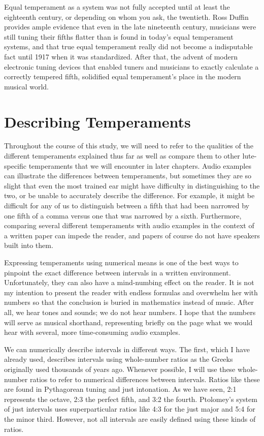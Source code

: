 Equal temperament as a system was not fully accepted until at
least the eighteenth century, or depending on whom you
ask, the twentieth.  Ross Duffin provides ample
evidence that even in the late nineteenth century,
musicians were still tuning their fifths flatter than is found
in today's equal temperament systems, and that true equal
temperament really did not become a indisputable fact until 1917
when it was standardized. \autocite[138]{RD:1}  After that, the
advent of modern electronic tuning devices that enabled tuners
and musicians to exactly calculate
a correctly tempered fifth,
solidified equal temperament's place in the modern musical world.

\section{Describing Temperaments}

Throughout the course of this study, we will need to refer to the qualities of
the different temperaments explained thus far as well as compare them to other
lute-specific temperaments that we will encounter in later chapters.  Audio
examples can illustrate the differences between temperaments, but sometimes they
are so slight that even the most trained ear might have difficulty in
distinguishing to the two, or be unable to accurately describe the difference.
For example, it might be difficult for any of us to distinguish between a fifth
that had been narrowed by one fifth of a comma versus one that was narrowed by a
sixth.  Furthermore, comparing several different temperaments with audio
examples in the context of a written paper can impede the reader, and papers of
course do not have speakers built into them.

Expressing temperaments using numerical means is one of the best ways to
pinpoint the exact difference between intervals in a written
environment.  Unfortunately, they can also have a mind-numbing effect on the
reader.  It is not my intention to present the reader with endless formulas and
overwhelm her with numbers so that the conclusion is buried in mathematics
instead of music.  After all, we hear tones and sounds; we do not hear numbers.
I hope that the numbers will serve as musical shorthand, representing briefly
on the page what we would hear with several, more time-consuming
audio examples.

We can numerically describe intervals in different ways.  The first, which I have
already used, describes intervals using whole-number ratios as the Greeks originally
used thousands of years ago.  Whenever possible, I will use these whole-number ratios
to refer to numerical differences between intervals.  Ratios like these are found in Pythagorean
tuning and just intonation.  As we have seen, 2:1 represents the octave, 2:3 the perfect
fifth, and 3:2 the fourth.  Ptolomey's system of just intervals uses superparticular ratios like
4:3 for the just major and 5:4 for the minor third.  However, not all intervals are easily
defined using these kinds of ratios.

